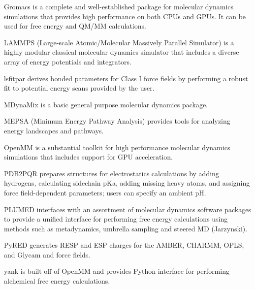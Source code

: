 Gromacs \cite{Pronk_2013} is a complete and well-established package for molecular dynamics simulations that provides high performance on both CPUs and GPUs.  It can be used for free energy and QM/MM calculations.

LAMMPS  (Large-scale Atomic/Molecular Massively Parallel Simulator) \cite{Plimpton_1995} is a highly modular classical molecular dynamics simulator that includes a diverse array of energy potentials and integrators.

lsfitpar \cite{Vanommeslaeghe_2015} derives bonded parameters for Class I force fields by performing a robust fit to potential energy scans provided by the user.

MDynaMix \cite{Lyubartsev_2000} is a basic general purpose molecular dynamics package.

MEPSA (Minimum Energy Pathway Analysis) \cite{Marcos_Alcalde_2015} provides tools for analyzing energy landscapes and pathways.

OpenMM  \cite{Eastman_2013} is a substantial toolkit for high performance molecular dynamics simulations that includes support for GPU acceleration.

PDB2PQR \cite{Dolinsky_2007} prepares structures for electrostatics calculations by adding hydrogens, calculating sidechain pKa, adding missing heavy atoms, and assigning force field-dependent parameters; users can specify an ambient pH.

PLUMED \cite{Tribello_2014} interfaces with an assortment of molecular dynamics software packages to provide a unified interface for performing free energy calculations using methods such as metadynamics, umbrella sampling and steered MD (Jarzynski).

PyRED \cite{Dupradeau_2010} generates RESP and ESP charges for the AMBER, CHARMM, OPLS, and Glycam and force fields.

yank is built off of OpenMM and provides Python interface for performing alchemical free energy calculations.